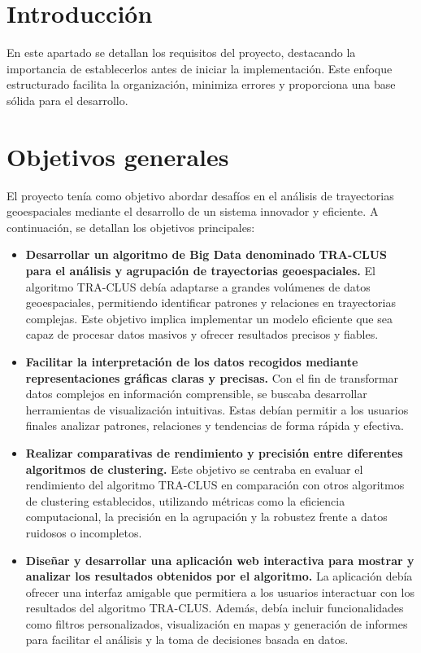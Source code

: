 
\section{Introducción}

En este apartado se detallan los requisitos del proyecto, destacando la importancia de establecerlos antes de iniciar la implementación. Este enfoque estructurado facilita la organización, minimiza errores y proporciona una base sólida para el desarrollo.

\section{Objetivos generales}

El proyecto tenía como objetivo abordar desafíos en el análisis de trayectorias geoespaciales mediante el desarrollo de un sistema innovador y eficiente. A continuación, se detallan los objetivos principales:

\begin{itemize}
    \item \textbf{Desarrollar un algoritmo de Big Data denominado TRA-CLUS para el análisis y agrupación de trayectorias geoespaciales.}  
    El algoritmo TRA-CLUS debía adaptarse a grandes volúmenes de datos geoespaciales, permitiendo identificar patrones y relaciones en trayectorias complejas. Este objetivo implica implementar un modelo eficiente que sea capaz de procesar datos masivos y ofrecer resultados precisos y fiables.

    \item \textbf{Facilitar la interpretación de los datos recogidos mediante representaciones gráficas claras y precisas.}  
    Con el fin de transformar datos complejos en información comprensible, se buscaba desarrollar herramientas de visualización intuitivas. Estas debían permitir a los usuarios finales analizar patrones, relaciones y tendencias de forma rápida y efectiva.

    \item \textbf{Realizar comparativas de rendimiento y precisión entre diferentes algoritmos de clustering.}  
    Este objetivo se centraba en evaluar el rendimiento del algoritmo TRA-CLUS en comparación con otros algoritmos de clustering establecidos, utilizando métricas como la eficiencia computacional, la precisión en la agrupación y la robustez frente a datos ruidosos o incompletos.

    \item \textbf{Diseñar y desarrollar una aplicación web interactiva para mostrar y analizar los resultados obtenidos por el algoritmo.}  
    La aplicación debía ofrecer una interfaz amigable que permitiera a los usuarios interactuar con los resultados del algoritmo TRA-CLUS. Además, debía incluir funcionalidades como filtros personalizados, visualización en mapas y generación de informes para facilitar el análisis y la toma de decisiones basada en datos.
\end{itemize}

